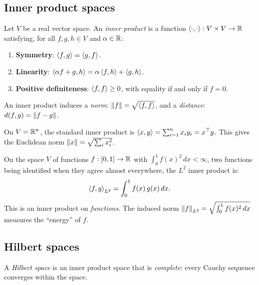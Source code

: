 \begin{notechapter}
\subsection{Inner product spaces}
\label{rkhs:subsec:inner_product}

\begin{definition}
Let $V$ be a real vector space. An \emph{inner product} is a function
$\left\langle \cdot, \cdot \right\rangle: V \times V \to \mathbb{R}$ satisfying, for all $f, g, h
\in V$ and $\alpha \in \mathbb{R}$:
\begin{enumerate}[label=(\roman*)]
  \item \textbf{Symmetry}: $\left\langle f, g \right\rangle = \left\langle g, f \right\rangle$.
  \item \textbf{Linearity}: $\left\langle \alpha f + g, h \right\rangle =
  \alpha\left\langle f, h \right\rangle + \left\langle g, h \right\rangle$.
  \item \textbf{Positive definiteness}: $\left\langle f, f \right\rangle \geq 0$, with
  equality if and only if $f = 0$.
\end{enumerate}
An inner product induces a \emph{norm}: $\left\|f\right\| =
\sqrt{\left\langle f, f \right\rangle}$, and a \emph{distance}: $d(f,g) = \left\|f - g\right\|$.
\end{definition}

\begin{example}
On $V = \mathbb{R}^n$, the standard inner product is $\left\langle x, y \right\rangle =
\sum_{i=1}^n x_i y_i = x^\top y$. This gives the Euclidean norm
$\left\|x\right\| = \sqrt{\sum_i x_i^2}$.
\end{example}

\begin{example}
On the space $V$ of functions $f:[0,1] \to \mathbb{R}$ with $\int_0^1 f(x)^2\,dx < \infty$,
two functions being identified when they agree almost everywhere, the $L^2$
inner product is:
\[
\left\langle f, g \right\rangle_{L^2} = \int_0^1 f(x)\,g(x)\,dx.
\]
This is an inner product on \emph{functions}. The induced norm
$\left\|f\right\|_{L^2} = \sqrt{\int_0^1 f(x)^2\,dx}$ measures the ``energy'' of
$f$.
\end{example}

\subsection{Hilbert spaces}
\label{rkhs:subsec:hilbert}

\begin{definition}
A \emph{Hilbert space} is an inner product space that is
\emph{complete}: every Cauchy sequence converges within the space.


\end{definition}
\end{notechapter}
